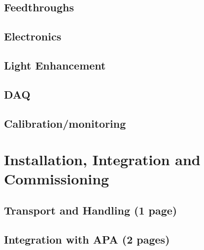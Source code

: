 \subsection{Feedthroughs}
\label{sec:fdsp-pd-intfc-feed}

\subsection{Electronics}
\label{sec:fdsp-pd-intfc-feed}

\subsection{Light Enhancement}
\label{sec:fdsp-pd-intfc-le}

\subsection{DAQ}
\label{sec:fdsp-pd-intfc-daq}

\subsection{Calibration/monitoring}
\label{sec:fdsp-pd-intfc-calib}



\section{Installation, Integration and Commissioning}
\label{sec:fdsp-pd-install}

\subsection{Transport and Handling (1 page)}
\label{sec:fdsp-pd-install-transport}


\subsection{Integration with APA  (2 pages)}
\label{sec:fdsp-pd-install-pd-apa}

